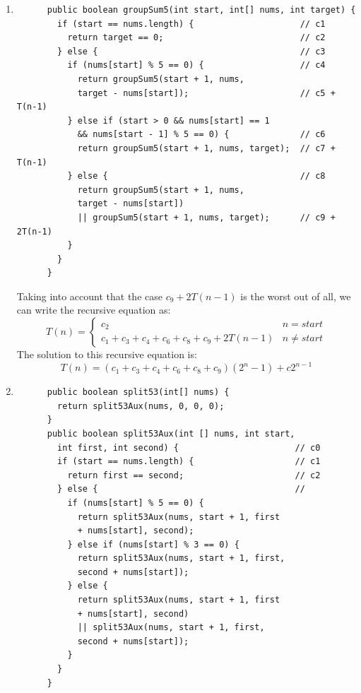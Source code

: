 \documentclass[a4paper,12pt]{article}
\begin{document}
\begin{enumerate}
      \item \begin{Verbatim}
      public boolean groupSum5(int start, int[] nums, int target) {
        if (start == nums.length) {                     // c1
          return target == 0;                           // c2
        } else {                                        // c3
          if (nums[start] % 5 == 0) {                   // c4
            return groupSum5(start + 1, nums,
            target - nums[start]);                      // c5 + T(n-1)
          } else if (start > 0 && nums[start] == 1
            && nums[start - 1] % 5 == 0) {              // c6
            return groupSum5(start + 1, nums, target);  // c7 + T(n-1)
          } else {                                      // c8
            return groupSum5(start + 1, nums,
            target - nums[start])
            || groupSum5(start + 1, nums, target);      // c9 + 2T(n-1)
          }
        }
      }
      \end{Verbatim}
      Taking into account that the case $c_9+2T(n-1)$ is the worst out of all, we can write the recursive equation as:
      \begin{equation*}
        T\left( n \right)=\left\{\begin{array}{cc} c_{2} & n=start \\ c_{1}+c_{3}+c_{4}+c_{6}+c_{8}+c_{9}+2T\left( n-1 \right) & n\neq start\end{array}\right.
      \end{equation*}
      The solution to this recursive equation is:
        \begin{equation*}
T\left( n \right)=\left( c_{1}+c_{3}+c_{4}+c_{6}+c_{8}+c_{9} \right)\left( 2^{n}-1 \right)+c2^{n-1}
        \end{equation*}
      \item \begin{Verbatim}
      public boolean split53(int[] nums) {
        return split53Aux(nums, 0, 0, 0);
      }
      public boolean split53Aux(int [] nums, int start,
        int first, int second) {                       // c0
        if (start == nums.length) {                    // c1
          return first == second;                      // c2
        } else {                                       //
          if (nums[start] % 5 == 0) {
            return split53Aux(nums, start + 1, first
            + nums[start], second);
          } else if (nums[start] % 3 == 0) {
            return split53Aux(nums, start + 1, first,
            second + nums[start]);
          } else {
            return split53Aux(nums, start + 1, first
            + nums[start], second)
            || split53Aux(nums, start + 1, first,
            second + nums[start]);
          }
        }
      }
      \end{Verbatim}
    \end{enumerate}\cite{Wolfram}
\end{document}

